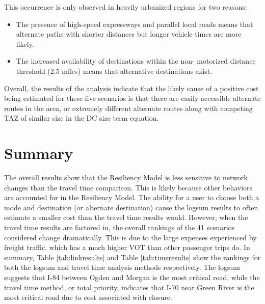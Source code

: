 This occurrence is only observed in heavily urbanized regions for two reasons:
\begin{itemize}
	\item The presence of high-speed expressways and parallel local roads
  means that alternate paths with shorter distances but longer vehicle
  times are more likely.
	\item The increased availability of destinations within the non-
  motorized distance threshold (2.5 miles) means that alternative
  destinations exist.

\end{itemize}

Overall, the results of the analysis indicate that the likely cause of a
positive cost being estimated for these five scenarios is that there are
easily
accessible alternate routes in the area, or extremely different alternate
routes along with competing TAZ of similar size in the DC size term
equation.

\section{Summary}

The overall results show that the Resiliency Model is less sensitive to
network changes than the travel time comparison. This is likely because
other behaviors are accounted for in the Resiliency Model. The ability for a user to
choose both a mode and destination (or alternate destination) cause the
logsum results to often estimate a smaller cost than the travel time
results would. However, when the travel time results are factored in, the
overall rankings of the 41 scenarios considered change dramatically. This
is due to the large expenses experienced by freight traffic, which has a
much higher VOT than other passenger trips do. In summary, Table
\ref{tab:linkresults} and Table \ref{tab:timeresults} show the rankings
for both the logsum and travel time analysis methods respectively. The
logsum suggests that I-84 between Ogden and Morgan is the most critical
road, while the travel time method, or total priority, indicates that I-70
near Green River is the most critical road due to cost associated with
closure.

